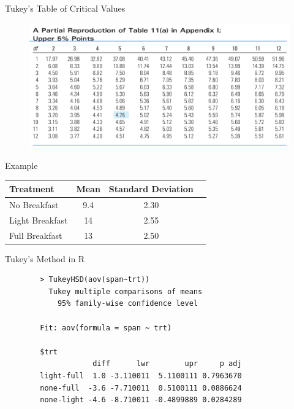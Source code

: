 \begin{frame}{Tukey's Table of Critical Values}
    \begin{figure}
        \centering
        \includegraphics[width=\textwidth]{images/tukeycvs.png}
    \end{figure}
\end{frame}

\begin{frame}{Example}
    \begin{table}[h]
        \centering
        \begin{tabular}{lccc}
            \hline
            Treatment       & Mean & Standard Deviation \\
            \hline
            No Breakfast    & 9.4 & 2.30 \\
            Light Breakfast & 14 & 2.55 \\
            Full Breakfast  & 13 & 2.50 \\
            \hline
        \end{tabular}
    \end{table}
\end{frame}

\begin{frame}[fragile]{Tukey's Method in R}
    \begin{verbatim}
        > TukeyHSD(aov(span~trt))
          Tukey multiple comparisons of means
            95% family-wise confidence level

        Fit: aov(formula = span ~ trt)

        $trt
                    diff      lwr        upr     p adj
        light-full  1.0 -3.110011  5.1100111 0.7963670
        none-full  -3.6 -7.710011  0.5100111 0.0886624
        none-light -4.6 -8.710011 -0.4899889 0.0284289
    \end{verbatim}
\end{frame}

